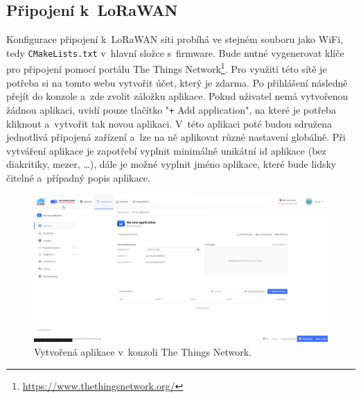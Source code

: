 \subsection{Připojení k~LoRaWAN}

Konfigurace připojení k~LoRaWAN síti probíhá ve stejném souboru jako WiFi, tedy \texttt{CMakeLists.txt} v~hlavní složce s~firmware. Bude nutné vygenerovat klíče pro připojení pomocí portálu The Things Network\footnote{\url{https://www.thethingsnetwork.org/}}. Pro využití této sítě je potřeba si na tomto webu vytvořit účet, který je zdarma. Po přihlášení následně přejít do konzole a~zde zvolit záložku aplikace. Pokud uživatel nemá vytvořenou žádnou aplikaci, uvidí pouze tlačítko "\texttt{+} Add application", na které je potřeba kliknout a~vytvořit tak novou aplikaci. V~této aplikaci poté budou sdružena jednotlivá připojená zařízení a~lze na ně aplikovat různé nastavení globálně. Při vytváření aplikace je zapotřebí vyplnit minimálně unikátní id aplikace (bez diakritiky, mezer, \dots), dále je možné vyplnit jméno aplikace, které bude lidsky čitelné a~případný popis aplikace.

\begin{figure}[h]
    \centering
    \includegraphics[width=\textwidth]{obrazky/ttnApps.png}
    \caption{Vytvořená aplikace v~konzoli The Things Network.}
    \label{fig_TTNApp}
\end{figure}

